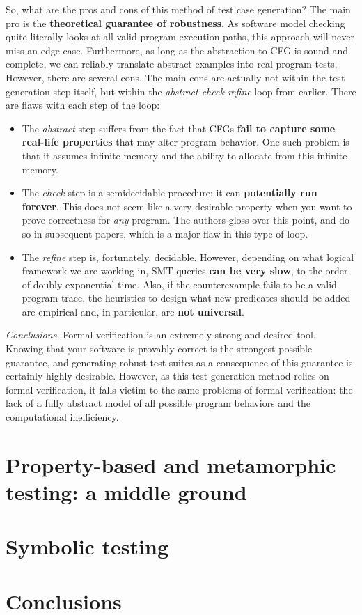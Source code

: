 \documentclass[acmsmall,review, nonacm]{acmart}
\begin{document}
So, what are the pros and cons of this method of test case generation? The main pro is the \textbf{theoretical guarantee of robustness}. As software model checking quite literally looks at all valid program execution paths, this approach will never miss an edge case. Furthermore, as long as the abstraction to CFG is sound and complete, we can reliably translate abstract examples into real program tests. However, there are several cons. The main cons are actually not within the test generation step itself, but within the \textit{abstract-check-refine} loop from earlier. There are flaws with each step of the loop:

\begin{itemize}
  \item The \textit{abstract} step suffers from the fact that CFGs \textbf{fail to capture some real-life properties} that may alter program behavior. One such problem is that it assumes infinite memory and the ability to allocate from this infinite memory.  
  \item The \textit{check} step is a semidecidable procedure: it can \textbf{potentially run forever}. This does not seem like a very desirable property when you want to prove correctness for \textit{any} program. The authors gloss over this point, and do so in subsequent papers, which is a major flaw in this type of loop.
  \item The \textit{refine} step is, fortunately, decidable. However, depending on what logical framework we are working in, SMT queries \textbf{can be very slow}, to the order of doubly-exponential time. Also, if the counterexample fails to be a valid program trace, the heuristics to design what new predicates should be added are empirical and, in particular, are \textbf{not universal}.  
\end{itemize}

\textit{Conclusions.} Formal verification is an extremely strong and desired tool. Knowing that your software is provably correct is the strongest possible guarantee, and generating robust test suites as a consequence of this guarantee is certainly highly desirable. However, as this test generation method relies on formal verification, it falls victim to the same problems of formal verification: the lack of a fully abstract model of all possible program behaviors and the computational inefficiency. 

\section{Property-based and metamorphic testing: a middle ground}


\section{Symbolic testing}

\section{Conclusions}

\end{document}
